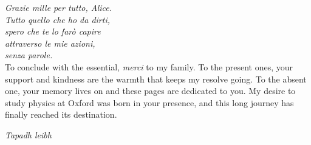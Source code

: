 \noindent\textit{Grazie mille per tutto, Alice.}\\
\noindent\textit{Tutto quello che ho da dirti,}\\
\noindent\textit{spero che te lo farò capire}\\
\noindent\textit{attraverso le mie azioni,}\\
\noindent\textit{senza parole.} \\

To conclude with the essential, \textit{merci} to my family. To the present ones, your support and kindness are the warmth that keeps my resolve going. To the absent one, your memory lives on and these pages are dedicated to you. My desire to study physics at Oxford was born in your presence, and this long journey has finally reached its destination. \\
\begin{center}
\textit{\color{oxfordblue} Tapadh leibh}
\end{center}